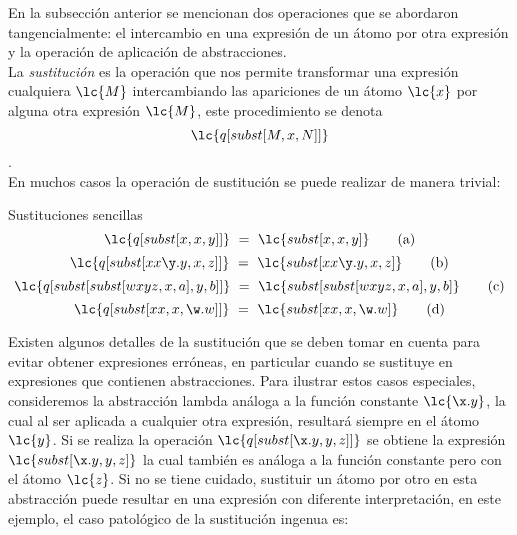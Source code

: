 En la subsección anterior se mencionan dos operaciones que se abordaron
tangencialmente: el intercambio en una expresión de un átomo por otra expresión
y la operación de aplicación de abstracciones. \\

La \emph{sustitución} es la operación que nos permite transformar una expresión
cualquiera \(\lc{M}\) intercambiando las apariciones de un átomo \(\lc{x}\) por alguna
otra expresión \(\lc{M}\), este procedimiento se denota
\[\lc{q[subst[M,x,N]]}\]. \\

En muchos casos la operación de sustitución se puede realizar de manera trivial:

\begin{ejemplo} Sustituciones sencillas
  \label{ejemplo:sustitucion1}
  \begin{equation} \label{ejemplo:sustitucion1:a}
    \lc{q[subst[x,x,y]]}\ =\ \lc{subst[x,x,y]} \tag{a}
  \end{equation}
  \begin{equation} \label{ejemplo:sustitucion1:b}
    \lc{q[subst[x x \y.y,x,z]]}\ =\ \lc{subst[x x \y.y,x,z]} \tag{b}
  \end{equation}
  \begin{equation} \label{ejemplo:sustitucion1:c}
    \lc{q[subst[subst[w x y z,x,a],y,b]]}\ =\ \lc{subst[subst[w x y z,x,a],y,b]} \tag{c}
  \end{equation}
  \begin{equation} \label{ejemplo:sustitucion1:d}
    \lc{q[subst[x x,x,\w.w]]}\ =\ \lc{subst[x x,x,\w.w]} \tag{d}
  \end{equation}
\end{ejemplo}

Existen algunos detalles de la sustitución que se deben tomar en cuenta para
evitar obtener expresiones erróneas, en particular cuando se sustituye en
expresiones que contienen abstracciones. Para ilustrar estos casos especiales,
consideremos la abstracción lambda análoga a la función constante \(\lc{\x.y}\),
la cual al ser aplicada a cualquier otra expresión, resultará siempre en el
átomo \(\lc{y}\). Si se realiza la operación \(\lc{q[subst[\x.y,y,z]]}\) se
obtiene la expresión \(\lc{subst[\x.y,y,z]}\) la cual también es análoga a la
función constante pero con el átomo \(\lc{z}\). Si no se tiene cuidado,
sustituir un átomo por otro en esta abstracción puede resultar en una expresión
con diferente interpretación, en este ejemplo, el caso patológico de la
sustitución ingenua es:


